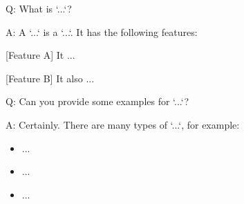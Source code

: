 Q:
  What is `...`?

A:
  A `...` is a `...`. It has the following features:

  [Feature A]
  It ...

  [Feature B]
  It also ...

Q:
  Can you provide some examples for `...`?

A:
  Certainly. There are many types of `...`, for example:
  \begin{itemize}
    \item ...
    \item ...
    \item ...
  \end{itemize}